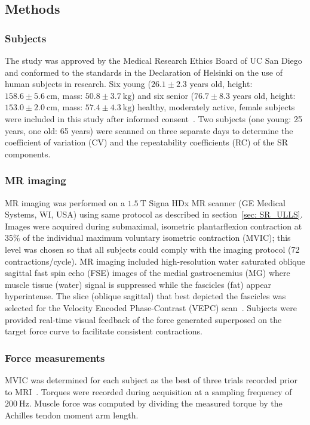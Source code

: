 \subsection{Methods}
\subsubsection{Subjects}
The study was approved by the Medical Research Ethics Board of UC San Diego and conformed to the standards in the Declaration of Helsinki on the use of human subjects in research.
Six young ($26.1 \pm 2.3$ years old, height: $158.6 \pm \SI{5.6}{\centi\meter}$, mass: $50.8 \pm \SI{3.7}{\kilogram}$) and six senior ($76.7 \pm 8.3$ years old, height: $153.0 \pm \SI{2.0}{\centi\meter}$, mass: $57.4 \pm \SI{4.3}{\kilogram}$) healthy, moderately active, female subjects were included in this study after informed consent~\cite{RNS16}. 
Two subjects (one young: 25 years, one old: 65 years) were scanned on three separate days to determine the coefficient of variation (CV) and the repeatability coefficients (RC) of the SR components. 
\subsubsection{MR imaging}
MR imaging was performed on a $\SI{1.5}{\tesla}$ Signa HDx MR scanner (GE Medical Systems, WI, USA) using same protocol as described in section~\ref{sec: SR_ULLS}. 
Images were acquired during submaximal, isometric plantarflexion contraction at $35\%$ of the individual maximum voluntary isometric contraction (MVIC); this level was chosen so that all subjects could comply with the imaging protocol (72 contractions/cycle). 
MR imaging included high-resolution water saturated oblique sagittal fast spin echo (FSE) images of the medial gastrocnemius (MG) where muscle tissue (water) signal is suppressed while the fascicles (fat) appear hyperintense. 
The slice (oblique sagittal) that best depicted the fascicles was selected for the Velocity Encoded Phase-Contrast (VEPC) scan~\cite{RNS16}.
Subjects were provided real-time visual feedback of the force generated superposed on the target force curve to facilitate consistent contractions.
\subsubsection{Force measurements}
MVIC was determined for each subject as the best of three trials recorded prior to MRI~\cite{RNS16, RNSS10}. 
Torques were recorded during acquisition at a sampling frequency of $\SI{200}{\hertz}$.
Muscle force was computed by dividing the measured torque by the Achilles tendon moment arm length.
